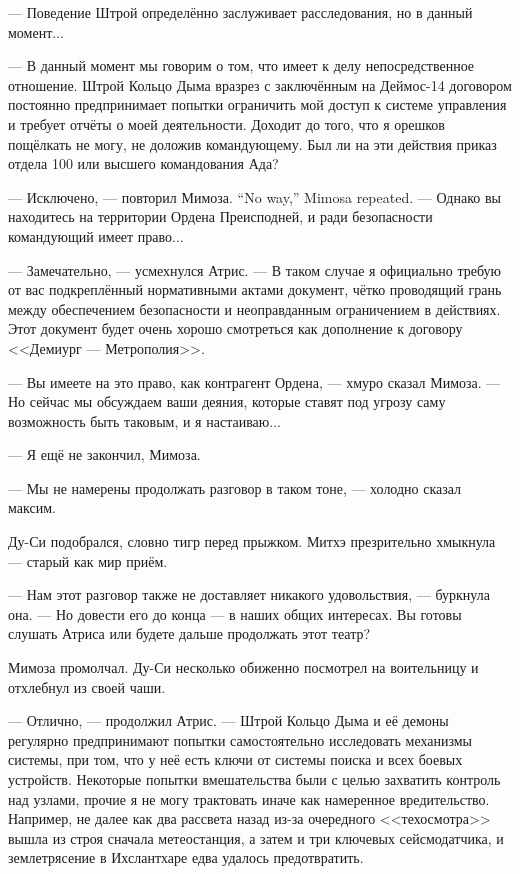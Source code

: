 --- Поведение Штрой определённо заслуживает расследования, но в данный момент...

--- В данный момент мы говорим о том, что имеет к делу непосредственное отношение.
Штрой Кольцо Дыма вразрез с заключённым на Деймос-14 договором постоянно предпринимает попытки ограничить мой доступ к системе управления и требует отчёты о моей деятельности.
Доходит до того, что я орешков пощёлкать не могу, не доложив командующему.
Был ли на эти действия приказ отдела 100 или высшего командования Ада?

{--- Исключено, --- повторил Мимоза.}
{``No way,'' Mimosa repeated.}
--- Однако вы находитесь на территории Ордена Преисподней, и ради безопасности командующий имеет право...

--- Замечательно, --- усмехнулся Атрис.
--- В таком случае я официально требую от вас подкреплённый нормативными актами документ, чётко проводящий грань между обеспечением безопасности и неоправданным ограничением в действиях.
Этот документ будет очень хорошо смотреться как дополнение к договору <<Демиург --- Метрополия>>.

--- Вы имеете на это право, как контрагент Ордена, --- хмуро сказал Мимоза.
--- Но сейчас мы обсуждаем ваши деяния, которые ставят под угрозу саму возможность быть таковым, и я настаиваю...

--- Я ещё не закончил, Мимоза.

--- Мы не намерены продолжать разговор в таком тоне, --- холодно сказал максим.

Ду-Си подобрался, словно тигр перед прыжком.
Митхэ презрительно хмыкнула --- старый как мир приём.

--- Нам этот разговор также не доставляет никакого удовольствия, --- буркнула она.
--- Но довести его до конца --- в наших общих интересах.
Вы готовы слушать Атриса или будете дальше продолжать этот театр?

Мимоза промолчал.
Ду-Си несколько обиженно посмотрел на воительницу и отхлебнул из своей чаши.

--- Отлично, --- продолжил Атрис.
--- Штрой Кольцо Дыма и её демоны регулярно предпринимают попытки самостоятельно исследовать механизмы системы, при том, что у неё есть ключи от системы поиска и всех боевых устройств.
Некоторые попытки вмешательства были с целью захватить контроль над узлами, прочие я не могу трактовать иначе как намеренное вредительство.
Например, не далее как два рассвета назад из-за очередного <<техосмотра>> вышла из строя сначала метеостанция, а затем и три ключевых сейсмодатчика, и землетрясение в Ихслантхаре едва удалось предотвратить.

